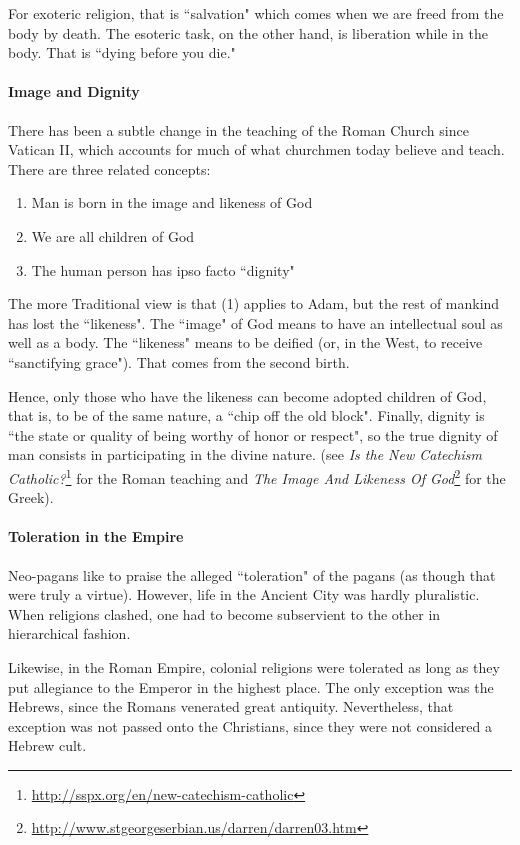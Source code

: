 For exoteric religion, that is ``salvation" which comes when we are freed from the body by death. The esoteric task, on the other hand, is liberation while in the body. That is ``dying before you die."

\paragraph{Image and Dignity}
There has been a subtle change in the teaching of the Roman Church since Vatican II, which accounts for much of what churchmen today believe and teach. There are three related concepts:

\begin{enumerate}
\item Man is born in the image and likeness of God 
\item We are all children of God 
\item The human person has ipso facto ``dignity" 
\end{enumerate}
The more Traditional view is that (1) applies to Adam, but the rest of mankind has lost the ``likeness". The ``image" of God means to have an intellectual soul as well as a body. The ``likeness" means to be deified (or, in the West, to receive ``sanctifying grace"). That comes from the second birth.

Hence, only those who have the likeness can become adopted children of God, that is, to be of the same nature, a ``chip off the old block". Finally, dignity is ``the state or quality of being worthy of honor or respect", so the true dignity of man consists in participating in the divine nature. (see \textit{Is the New Catechism Catholic?}\footnote{\url{http://sspx.org/en/new-catechism-catholic}} for the Roman teaching and \textit{The Image And Likeness Of God}\footnote{\url{http://www.stgeorgeserbian.us/darren/darren03.htm}} for the Greek).

\paragraph{Toleration in the Empire}
Neo-pagans like to praise the alleged ``toleration" of the pagans (as though that were truly a virtue). However, life in the Ancient City was hardly pluralistic. When religions clashed, one had to become subservient to the other in hierarchical fashion.

Likewise, in the Roman Empire, colonial religions were tolerated as long as they put allegiance to the Emperor in the highest place. The only exception was the Hebrews, since the Romans venerated great antiquity. Nevertheless, that exception was not passed onto the Christians, since they were not considered a Hebrew cult.

